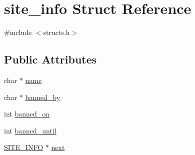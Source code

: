 \hypertarget{structsite__info}{\section{site\-\_\-info Struct Reference}
\label{structsite__info}
}


{\ttfamily \#include $<$structs.\-h$>$}

\subsection*{Public Attributes}
\begin{DoxyCompactItemize}
\item 
char $\ast$ \hyperlink{structsite__info_aeb8333222942b254f8ec2cdb141c4136}{name}
\item 
char $\ast$ \hyperlink{structsite__info_a6e91d77e15687804e91f05ec61252162}{banned\-\_\-by}
\item 
int \hyperlink{structsite__info_abf2619a1a6c000e746ed8098e0a463ae}{banned\-\_\-on}
\item 
int \hyperlink{structsite__info_af7c62b1c6c03b33ac1b853f398b3ab39}{banned\-\_\-until}
\item 
\hyperlink{structs_8h_abbdef5ffa3256b4a60e16f68ca3b949e}{S\-I\-T\-E\-\_\-\-I\-N\-F\-O} $\ast$ \hyperlink{structsite__info_a23c00a3e8306769f4e8c759762758617}{next}
\end{DoxyCompactItemize}


